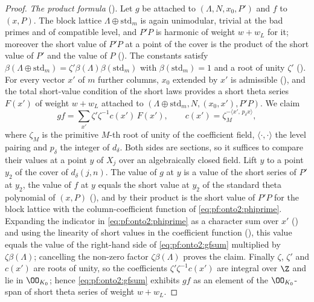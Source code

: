 \begin{proof}
\emph{The product formula} (). Let $g$ be attached to $(\Lambda,N,x_0,P')$ and $f$
to $(x,P)$. The block lattice $\Lambda\oplus\mathrm{std}_m$ is again unimodular, trivial at the bad primes and of compatible level,
and $P'P$ is harmonic of weight $w+w_L$ for it; moreover the short value of $P'P$ at a point of the cover is the product of the
short value of $P'$ and the value of $P$ (). The constants satisfy
$\beta(\Lambda\oplus\mathrm{std}_m)=\zeta'\beta(\Lambda)\beta(\mathrm{std}_m)$ with $\beta(\mathrm{std}_m)=1$ and a root of unity
$\zeta'$ (). For every vector $x'$ of $m$ further columns, $x_0$ extended by $x'$ is
admissible (), and the total short-value condition of the short laws
provides a short theta series $F(x')$ of weight $w+w_L$ attached to $(\Lambda\oplus\mathrm{std}_m,N,(x_0,x'),P'P)$. We claim
\begin{equation}\label{eq:pf:onto2:gfsum}
gf=\sum_{x'}\zeta'\zeta^{-1}c(x')\,F(x'),\qquad c(x')=\zeta_M^{-\langle x',\,p_\delta x\rangle},
\end{equation}
where $\zeta_M$ is the primitive $M$-th root of unity of the coefficient field, $\langle\cdot,\cdot\rangle$ the level pairing and
$p_\delta$ the integer of $d_\delta$. Both sides are sections, so it suffices to compare their values at a point $y$ of $X_j$ over an
algebraically closed field. Lift $y$ to a point $y_2$ of the cover of $d_\delta(j,n)$. The value of $g$ at $y$ is a value of the
short series of $P'$ at $y_2$, the value of $f$ at $y$ equals the short value at $y_2$ of the standard theta polynomial of $(x,P)$
(), and by  their
product is the short value of $P'P$ for the block lattice with the column-coefficient function of \eqref{eq:pf:onto2:phiprime}.
Expanding the indicator in \eqref{eq:pf:onto2:phiprime} as a character sum over $x'$
() and using the linearity of short values in the coefficient function
(), this value equals the value of the right-hand side of
\eqref{eq:pf:onto2:gfsum} multiplied by $\zeta\beta(\Lambda)$; cancelling the non-zero factor $\zeta\beta(\Lambda)$ proves the claim.
Finally $\zeta$, $\zeta'$ and $c(x')$ are roots of unity, so the coefficients $\zeta'\zeta^{-1}c(x')$ are integral over $\Z$ and lie in
$\OO_{K_0}$; hence \eqref{eq:pf:onto2:gfsum} exhibits $gf$ as an element of the $\OO_{K_0}$-span of short theta series of weight
$w+w_L$.
\end{proof}

